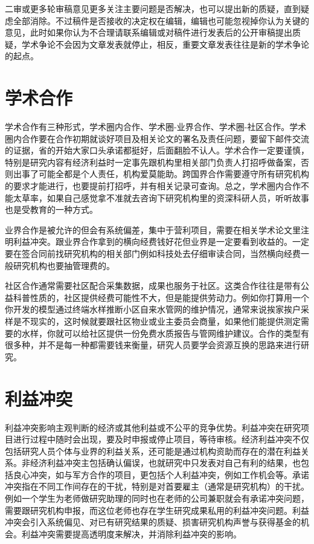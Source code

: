 \documentclass[]{tufte-book}
\begin{document}
二审或更多轮审稿意见更多关注主要问题是否解决，也可以提出新的质疑，直到疑虑全部消除。不过稿件是否接收的决定权在编辑，编辑也可能忽视掉你认为关键的意见，此时如果你认为不合理请联系编辑或对稿件进行发表后的公开审稿提出质疑，学术争论不会因为文章发表就停止，相反，重要文章发表往往是新的学术争论的起点。

\hypertarget{ux5b66ux672fux5408ux4f5c}{%
\section{学术合作}\label{ux5b66ux672fux5408ux4f5c}}

学术合作有三种形式，学术圈内合作、学术圈-业界合作、学术圈-社区合作。学术圈内合作要在合作初期就谈好项目及相关论文的署名及责任问题，要留下邮件交流的证据，省的开始大家口头承诺都挺好，后面翻脸不认人。学术合作一定要谨慎，特别是研究内容有经济利益时一定事先跟机构里相关部门负责人打招呼做备案，否则出事了可能全都是个人责任，机构爱莫能助。跨国界合作需要遵守所有研究机构的要求才能进行，也要提前打招呼，并有相关记录可查询。总之，学术圈内合作不能太草率，如果自己感觉拿不准就去咨询下研究机构里的资深科研人员，听听故事也是受教育的一种方式。

业界合作是被允许的但会有系统偏差，集中于营利项目，需要在相关学术论文里注明利益冲突。跟业界合作拿到的横向经费钱好花但业界是一定要看到收益的。一定要在签合同前找研究机构的相关部门例如科技处去仔细审读合同，当然横向经费一般研究机构也要抽管理费的。

社区合作通常需要社区配合采集数据，成果也服务于社区。这类合作往往是带有公益科普性质的，社区提供经费可能性不大，但是能提供劳动力。例如你打算用一个你开发的模型通过终端水样推断小区自来水管网的维护情况，通常来说挨家挨户采样是不现实的，这时候就要跟社区物业或业主委员会商量，如果他们能提供测定需要的水样，你就可以给社区提供一份免费水质报告与管网维护建议。合作的类型有很多种，并不是每一种都需要钱来衡量，研究人员要学会资源互换的思路来进行研究。

\hypertarget{ux5229ux76caux51b2ux7a81}{%
\section{利益冲突}\label{ux5229ux76caux51b2ux7a81}}

利益冲突影响主观判断的经济或其他利益或不公平的竞争优势。利益冲突在研究项目进行过程中随时会出现，要及时申报或停止项目，等待审核。经济利益冲突不仅包括研究人员个体与业界的利益关系，还可能是通过机构资助而存在的潜在利益关系。非经济利益冲突主包括确认偏误，也就研究中只发表对自己有利的结果，也包括良心冲突，如与军方合作的项目，更包括个人利益冲突，例如工作机会等。承诺冲突指在不同工作间存在的干扰，特别是对首要雇主（通常是研究机构）的干扰。例如一个学生为老师做研究助理的同时也在老师的公司兼职就会有承诺冲突问题，需要跟研究机构申报，而这位老师也存在学生研究成果私用的利益冲突问题。利益冲突会引入系统偏见、对已有研究结果的质疑、损害研究机构声誉与获得基金的机会。利益冲突需要提高透明度来解决，并消除利益冲突的影响。
\end{document}
